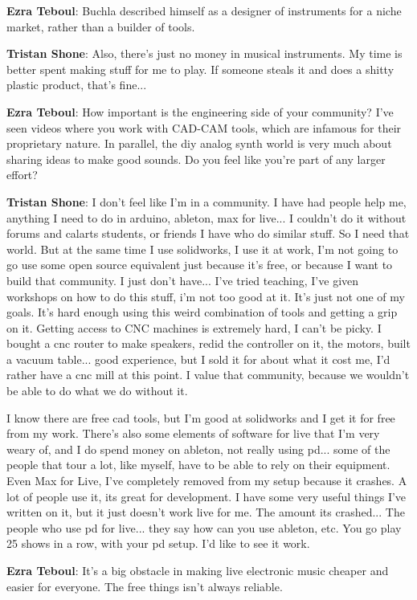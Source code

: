 \textbf{Ezra Teboul}: Buchla described himself as a designer of instruments for a niche market, rather than a builder of tools. 

\textbf{Tristan Shone}: Also, there's just no money in musical instruments. My time is better spent making stuff for me to play. If someone steals it and does a shitty plastic product, that's fine... 

\textbf{Ezra Teboul}: How important is the engineering side of your community? I've seen videos where you work with CAD-CAM tools, which are infamous for their proprietary nature. In parallel, the diy analog synth world is very much about sharing ideas to make good sounds. Do you feel like you're part of any larger effort? 

\textbf{Tristan Shone}: I don't feel like I'm in a community. I have had people help me, anything I need to do in arduino, ableton, max for live... I couldn't do it without forums and calarts students, or friends I have who do similar stuff. So I need that world. But at the same time I use solidworks, I use it at work, I'm not going to go use some open source equivalent just because it's free, or because I want to build that community. I just don't have... I've tried teaching, I've given workshops on how to do this stuff, i'm not too good at it. It's just not one of my goals. It's hard enough using this weird combination of tools and getting a grip on it. Getting access to CNC machines is extremely hard, I can't be picky. I bought a cnc router to make speakers, redid the controller on it, the motors, built a vacuum table... good experience, but I sold it for about what it cost me, I'd rather have a cnc mill at this point. I value that community, because we wouldn't be able to do what we do without it. 

I know there are free cad tools, but I'm good at solidworks and I get it for free from my work. There's also some elements of software for live that I'm very weary of, and I do spend money on ableton, not really using pd... some of the people that tour a lot, like myself, have to be able to rely on their equipment. Even Max for Live, I've completely removed from my setup because it crashes. A lot of people use it, its great for development. I have some very useful things I've written on it, but it just doesn't work live for me. The amount its crashed... The people who use pd for live... they say how can you use ableton, etc. You go play 25 shows in a row, with your pd setup. I'd like to see it work. 

\textbf{Ezra Teboul}: It's a big obstacle in making live electronic music cheaper and easier for everyone. The free things isn't always reliable.

